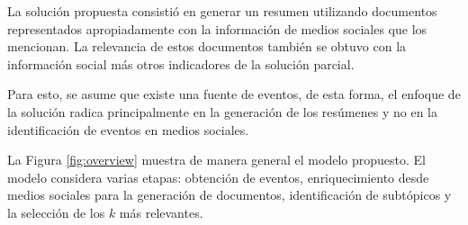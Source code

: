 \documentclass[upright, contnum]{umemoria}
\begin{document}
\label{cap:solucion}

  La solución propuesta consistió en generar un resumen utilizando
  documentos representados apropiadamente con la información de medios
  sociales que los mencionan. La relevancia de estos documentos
  también se obtuvo con la información social más otros indicadores de
  la solución parcial. 

  Para esto, se asume que existe una fuente de eventos, de esta forma,
  el enfoque de la solución radica principalmente en la generación de
  los resúmenes y no en la identificación de eventos en medios
  sociales. 

  La Figura \ref{fig:overview} muestra de manera general el modelo
  propuesto. El modelo considera varias etapas: obtención de eventos,
  enriquecimiento desde medios sociales para la generación de
  documentos, identificación de subtópicos y la selección de los $k$
  más relevantes.
\end{document}
